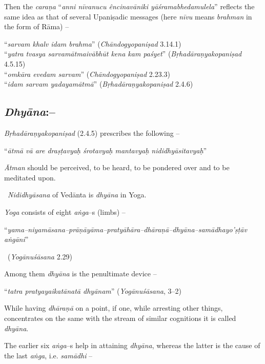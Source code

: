Then the \textit{caraṇa} “\textit{anni nīvanucu êncinavāniki yāśramabhedamulela}” reflects the same idea as that of several Upaniṣadic messages (here \textit{nīvu} means \textit{brahman} in the form of Rāma) –

\begin{myquote}
“\textit{sarvam khalv idam brahma}” (\textit{Chāndogyopaniṣad} 3.14.1)\\ “\textit{yatra tvasya sarvamātmaivābhūt kena kam paśyet}” (\textit{Bṛhadāraṇyakopaniṣad} 4.5.15)\\ “\textit{omkāra evedam sarvam}” (\textit{Chāndogyopaniṣad} 2.23.3)\\ “\textit{idam sarvam yadayamātmā}” (\textit{Bṛhadāraṇyakopaniṣad} 2.4.6)
\end{myquote}


\subsection*{\textit{Dhyāna}:–}

\textit{Bṛhadāraṇyakopaniṣad} (2.4.5) prescribes the following –

\begin{myquote}
“\textit{ātmā vā are draṣṭavyaḥ śrotavyaḥ mantavyaḥ nididhyāsitavyaḥ}”
\end{myquote}

\textit{Ātman} should be perceived, to be heard, to be pondered over and to be meditated upon.

 \textit{Nididhyāsana} of Vedānta is \textit{dhyāna} in Yoga.

\textit{Yoga} consists of eight \textit{aṅga}–s (limbs) –

\begin{myquote}
“\textit{yama–niyamāsana–prāṇāyāma–pratyāhāra–dhāraṇā–dhyāna–samādhayo’ṣṭāv aṅgāni}” 

~\hfill (\textit{Yogānuśāsana} 2.29)
\end{myquote}

Among them \textit{dhyāna} is the penultimate device –

\begin{myquote}
“\textit{tatra pratyayaikatānatā dhyānam}” (\textit{Yogānuśāsana}, 3–2)
\end{myquote}

While having \textit{dhāraṇā} on a point, if one, while arresting other things, concentrates on the same with the stream of similar cognitions it is called \textit{dhyāna}.

The earlier six \textit{aṅga}–s help in attaining \textit{dhyāna}, whereas the latter is the cause of the last \textit{aṅga}, i.e. \textit{samādhi} –

